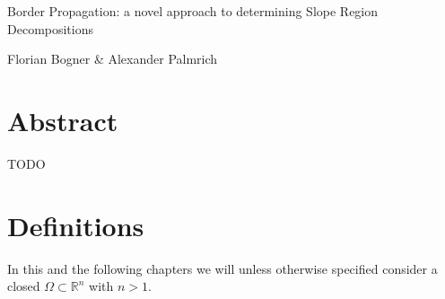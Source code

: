 \documentclass[a4paper,12pt]{paper}
\begin{document}
\begin{titlepage}
\huge
\centering
Border Propagation: a novel approach to determining Slope Region Decompositions

\vfill

\normalsize
Florian Bogner \& Alexander Palmrich
\end{titlepage}




\tableofcontents
\newpage


\section{Abstract}

TODO

\section{Definitions}

In this and the following chapters we will unless otherwise specified consider a closed $\Omega \subset \mathbb{R}^n$ with $n > 1$.
\end{document}
